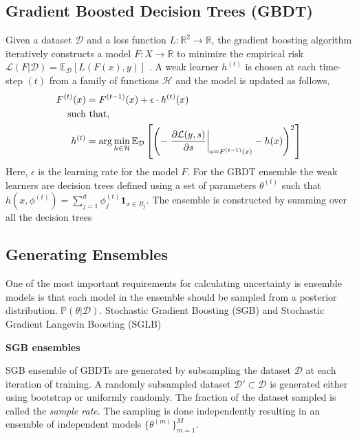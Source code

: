 \documentclass{article}
\begin{document}
\subsection{Gradient Boosted Decision Trees (GBDT)}

Given a dataset $\mathcal{D}$ and a loss function $L : \mathbb{R}^2 \to \mathbb{R}$, the gradient boosting algorithm iteratively constructs a model $F : X \to \mathbb{R}$ to minimize the empirical risk $\mathcal{L}(F|\mathcal{D}) = \mathbb{E}_{\mathcal{D}} [L(F(x),y)]$ \citet{friedman}. A weak learner $h^{(t)}$ is chosen at each time-step $(t)$ from a family of functions $\mathcal{H}$ and the model is updated as follows,
\begin{align}
	F^{(t)}(x) &= F^{(t-1)}(x) + \epsilon \cdot h^{(t)}(x) \\
	\text{such} &\text{ that, } \notag \\
	h^{(t)} &= \arg \min_{h \in \mathcal{H}} \mathbb{E}_{\mathcal{D}} \left[ \left( - \left. \frac{\partial{\mathcal{L}(y,s)}}{\partial{s}} \right|_{s = F^{(t-1)}(x)} - h(x) \right)^2 \right]
\end{align}
Here, $\epsilon$ is the learning rate for the model $F$. For the GBDT ensemble the weak learners are decision trees defined using a set of parameters $\theta^{(t)}$ such that $h(x, \phi^{(t)}) = \sum\limits_{j=1}^{d} \phi_{j}^{(t)} \textbf{1}_{x \in R_{j}}$. The ensemble is constructed by summing over all the decision trees

\subsection{Generating Ensembles}

One of the most important requirements for calculating uncertainty is ensemble models is that each model in the ensemble should be sampled from a posterior distribution. $\mathbb{P}(\theta | \mathcal{D})$. Stochastic Gradient Boosting (SGB) and Stochastic Gradient Langevin Boosting (SGLB) 

\textbf{SGB ensembles}

SGB ensemble of GBDTs are generated by subsampling the dataset $\mathcal{D}$ at each iteration  of training. A randomly subsampled dataset $\mathcal{D'} \subset \mathcal{D}$ is generated either using bootstrap or uniformly randomly. The fraction of the dataset sampled is called the \textit{sample rate}. The sampling is done independently resulting in an ensemble of independent models $\{ \theta^{(m)} \}_{m=1}^M$.
\end{document}
